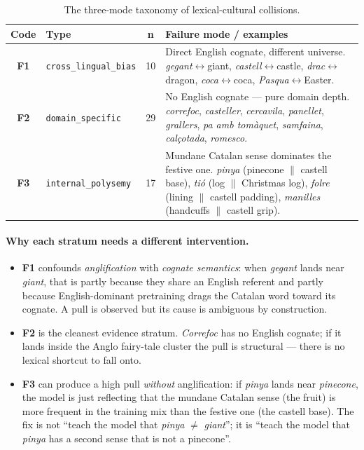 \documentclass[10pt,twocolumn,a4paper]{article}
\newcommand{\code}[1]{\texttt{\small #1}}
\newcommand{\concept}[1]{\emph{#1}}
\newcommand{\Fone}{\textbf{F1}}
\newcommand{\Ftwo}{\textbf{F2}}
\newcommand{\Fthree}{\textbf{F3}}
\begin{document}
\begin{table}[t]
  \centering
  \small
  \renewcommand{\arraystretch}{1.35}
  \begin{tabular}{@{}clcp{9.6cm}@{}}
    \toprule
    \textbf{Code} & \textbf{Type} & \textbf{n} & \textbf{Failure mode / examples} \\
    \midrule
    \Fone{} & \code{cross\_lingual\_bias} & 10 &
      Direct English cognate, different universe.
      \concept{gegant}$\leftrightarrow$giant, \concept{castell}$\leftrightarrow$castle,
      \concept{drac}$\leftrightarrow$dragon, \concept{coca}$\leftrightarrow$coca,
      \concept{Pasqua}$\leftrightarrow$Easter. \\
    \Ftwo{} & \code{domain\_specific} & 29 &
      No English cognate --- pure domain depth.
      \concept{correfoc}, \concept{casteller}, \concept{cercavila},
      \concept{panellet}, \concept{grallers}, \concept{pa amb tomàquet},
      \concept{samfaina}, \concept{calçotada}, \concept{romesco}. \\
    \Fthree{} & \code{internal\_polysemy} & 17 &
      Mundane Catalan sense dominates the festive one.
      \concept{pinya} (pinecone $\|$ castell base),
      \concept{tió} (log $\|$ Christmas log),
      \concept{folre} (lining $\|$ castell padding),
      \concept{manilles} (handcuffs $\|$ castell grip). \\
    \bottomrule
  \end{tabular}
  \caption{The three-mode taxonomy of lexical-cultural collisions.}
  \label{tab:taxonomy}
\end{table}

\paragraph{Why each stratum needs a different intervention.}
\begin{itemize}[leftmargin=1.3em,itemsep=3pt,topsep=2pt]
  \item \Fone{} confounds \emph{anglification} with \emph{cognate semantics}:
        when \concept{gegant} lands near \emph{giant}, that is partly because
        they share an English referent and partly because English-dominant
        pretraining drags the Catalan word toward its cognate. A pull is
        observed but its cause is ambiguous by construction.
  \item \Ftwo{} is the cleanest evidence stratum. \concept{Correfoc} has no
        English cognate; if it lands inside the Anglo fairy-tale cluster the
        pull is structural --- there is no lexical shortcut to fall onto.
  \item \Fthree{} can produce a high pull \emph{without} anglification: if
        \concept{pinya} lands near \emph{pinecone}, the model is just
        reflecting that the mundane Catalan sense (the fruit) is more frequent
        in the training mix than the festive one (the castell base). The fix
        is not ``teach the model that \concept{pinya} $\neq$ \emph{giant}''; it
        is ``teach the model that \concept{pinya} has a second sense that is
        not a pinecone''.
\end{itemize}
\end{document}
